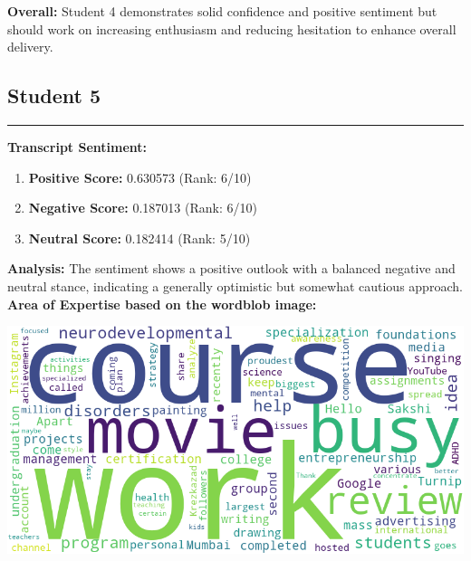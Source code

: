 \documentclass{article}
\begin{document}
\textbf{Overall:} Student 4 demonstrates solid confidence and positive sentiment but should work on increasing enthusiasm and reducing hesitation to enhance overall delivery.


\vspace{0.3in}
\subsection{Student 5}
\begin{center}
    \color{green}\rule{1\linewidth}{0.7mm}
\end{center}

\large{\textbf{Transcript Sentiment:}}
\begin{tcolorbox}[colback=green!5!white,colframe=green!75!black,title=Sentiment Breakdown]
    \begin{enumerate}
        \item \textbf{Positive Score:} \textcolor{green!70!black}{0.630573} (Rank: 6/10)
        \item \textbf{Negative Score:} \textcolor{red!70!black}{0.187013} (Rank: 6/10)
        \item \textbf{Neutral Score:} \textcolor{blue!70!black}{0.182414} (Rank: 5/10)
    \end{enumerate}
\end{tcolorbox}
\textbf{Analysis:} The sentiment shows a positive outlook with a balanced negative and neutral stance, indicating a generally optimistic but somewhat cautious approach.
\vspace{0.3in}
\LARGE \textbf{Area of Expertise based on the wordblob image:} \normalsize
\begin{center}
    \includegraphics[width=1\columnwidth]{images/wordcloud_5.png}
\end{center}
\end{document}
